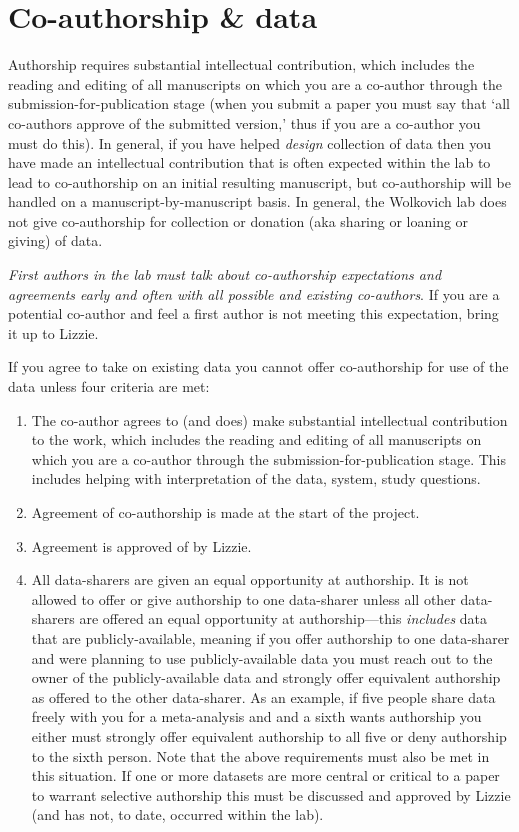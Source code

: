 \documentclass[11pt,a4paper,oneside]{article}
\begin{document}
\section{Co-authorship \& data}
Authorship requires substantial intellectual contribution, which includes the reading and editing of all manuscripts on which you are a co-author through the submission-for-publication stage (when you submit a paper you must say that `all co-authors approve of the submitted version,' thus if you are a co-author you must do this). In general, if you have helped \emph{design} collection of data then you have made an intellectual contribution that is often expected within the lab to lead to co-authorship on an initial resulting manuscript, but co-authorship will be handled on a manuscript-by-manuscript basis. In general, the Wolkovich lab does not give co-authorship for collection or donation (aka sharing or loaning or giving) of data. 

\emph{First authors in the lab must talk about co-authorship expectations and agreements early and often with all possible and existing co-authors}. If you are a potential co-author and feel a first author is not meeting this expectation, bring it up to Lizzie.

If you agree to take on existing data you cannot offer co-authorship for use of the data unless four criteria are met:
\begin{enumerate}
\item The co-author agrees to (and does) make substantial intellectual contribution to the work, which includes the reading and editing of all manuscripts on which you are a co-author through the submission-for-publication stage. This includes helping with interpretation of the data, system, study questions. 
\item Agreement of co-authorship is made at the start of the project.
\item Agreement is approved of by Lizzie.
\item All data-sharers are given an equal opportunity at authorship. It is not allowed to offer or give authorship to one data-sharer unless all other data-sharers are offered an equal opportunity at authorship---this \emph{includes} data that are publicly-available, meaning if you offer authorship to one data-sharer and were planning to use publicly-available data you must reach out to the owner of the publicly-available data and strongly offer equivalent authorship as offered to the other data-sharer. As an example, if five people share data freely with you for a meta-analysis and and a sixth wants authorship you either must strongly offer equivalent authorship to all five or deny authorship to the sixth person. Note that the above requirements must also be met in this situation. If one or more datasets are more central or critical to a paper to warrant selective authorship this must be discussed and approved by Lizzie (and has not, to date, occurred within the lab). 
\end{enumerate}
\end{document}
